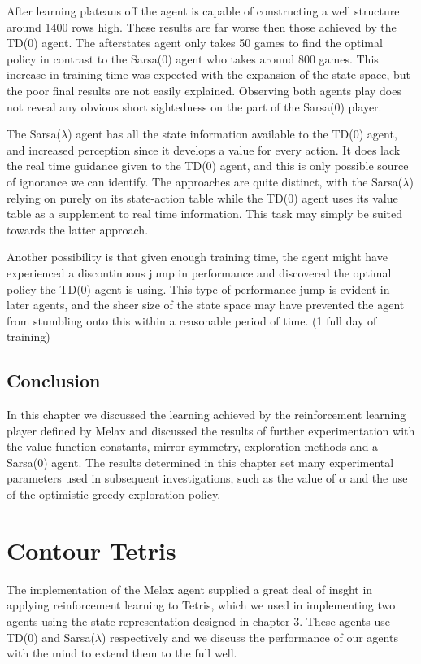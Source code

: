 \documentclass{rucsthesis}
\begin{document}
After learning plateaus off the agent is capable of constructing a well structure around 1400 rows high. These results are far worse then those achieved by the TD(0) agent. The afterstates agent only takes 50 games to find the optimal policy in contrast to the Sarsa(0) agent who takes around 800 games. This increase in training time was expected with the expansion of the state space, but the poor final results are not easily explained. Observing both agents play does not reveal any obvious short sightedness on the part of the Sarsa(0) player.

The Sarsa($\lambda$) agent has all the state information available to the TD(0) agent, and increased perception since it develops a value for every action. It does lack the real time guidance given to the TD(0) agent, and this is only possible source of ignorance we can identify. The approaches are quite distinct, with the Sarsa($\lambda$) relying on purely on its state-action table while the TD(0) agent uses its value table as a supplement to real time information. This task may simply be suited towards the latter approach.

Another possibility is that given enough training time, the agent might have experienced a discontinuous jump in performance and discovered the optimal policy the TD(0) agent is using. This type of performance jump is evident in later agents, and the sheer size of the state space may have prevented the agent from stumbling onto this within a reasonable period of time. (1 full day of training)

\section{Conclusion}

In this chapter we discussed the learning achieved by the reinforcement learning player defined by Melax and discussed the results of further experimentation with the value function constants, mirror symmetry, exploration methods and a Sarsa(0) agent. The results determined in this chapter set many experimental parameters used in subsequent investigations, such as the value of $\alpha$ and the use of the optimistic-greedy exploration policy.

\chapter{Contour Tetris}

The implementation of the Melax agent supplied a great deal of insght in applying reinforcement learning to Tetris, which we used in implementing two agents using the state representation designed in chapter 3.  These agents use TD(0) and Sarsa($\lambda$) respectively and we discuss the performance of our agents with the mind to extend them to the full well.
\end{document}
